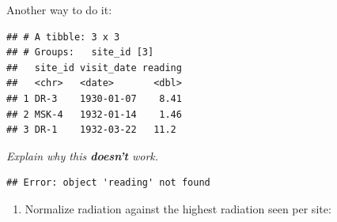 \documentclass[]{Nemilov}
\newenvironment{Shaded}{\begin{snugshade}}{\end{snugshade}}
\newcommand{\DataTypeTok}[1]{\textcolor[rgb]{0.13,0.29,0.53}{#1}}
\newcommand{\DecValTok}[1]{\textcolor[rgb]{0.00,0.00,0.81}{#1}}
\newcommand{\KeywordTok}[1]{\textcolor[rgb]{0.13,0.29,0.53}{\textbf{#1}}}
\newcommand{\NormalTok}[1]{#1}
\newcommand{\OperatorTok}[1]{\textcolor[rgb]{0.81,0.36,0.00}{\textbf{#1}}}
\newcommand{\StringTok}[1]{\textcolor[rgb]{0.31,0.60,0.02}{#1}}
\providecommand{\tightlist}{%
  \setlength{\itemsep}{0pt}\setlength{\parskip}{0pt}}
\begin{document}
Another way to do it:

\begin{Shaded}
\end{Shaded}

\begin{verbatim}
## # A tibble: 3 x 3
## # Groups:   site_id [3]
##   site_id visit_date reading
##   <chr>   <date>       <dbl>
## 1 DR-3    1930-01-07    8.41
## 2 MSK-4   1932-01-14    1.46
## 3 DR-1    1932-03-22   11.2
\end{verbatim}

\emph{Explain why this \textbf{doesn't} work.}

\begin{Shaded}
\end{Shaded}

\begin{verbatim}
## Error: object 'reading' not found
\end{verbatim}

\begin{enumerate}
\def\labelenumi{\arabic{enumi}.}
\setcounter{enumi}{7}
\tightlist
\item
  Normalize radiation against the highest radiation seen per site:
\end{enumerate}
\end{document}
